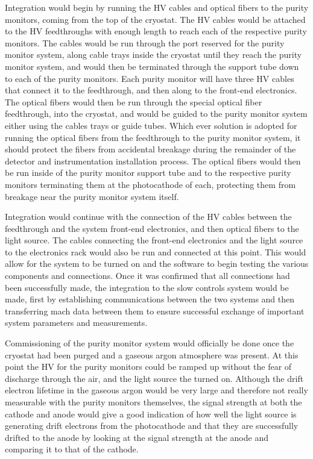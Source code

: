 Integration would begin by running the HV cables and optical fibers to the purity monitors, coming from the top of the cryostat.  The HV cables would be attached to the HV feedthroughs with enough length to reach each of the respective purity monitors.  The cables would be run through the port reserved for the purity monitor system, along cable trays inside the cryostat until they reach the purity monitor system, and would then be terminated through the support tube down to each of the purity monitors.  Each purity monitor will have three HV cables that connect it to the feedthrough, and then along to the front-end electronics.  The optical fibers would then be run through the special optical fiber feedthrough, into the cryostat, and would be guided to the purity monitor system either using the cables trays or guide tubes.  Which ever solution is adopted for running the optical fibers from the feedthrough to the purity monitor system, it should protect the fibers from accidental breakage during the remainder of the detector and instrumentation installation process.  The optical fibers would then be run inside of the purity monitor support tube and to the respective purity monitors terminating them at the photocathode of each, protecting them from breakage near the purity monitor system itself.

Integration would continue with the connection of the HV cables between the feedthrough and the system front-end electronics, and then optical fibers to the light source.  The cables connecting the front-end electronics and the light source to the electronics rack would also be run and connected at this point.  This would allow for the system to be turned on and the software to begin testing the various components and connections.  Once it was confirmed that all connections had been successfully made, the integration to the slow controls system would be made, first by establishing communications between the two systems and then transferring mach data between them to ensure successful exchange of important system parameters and measurements.  

Commissioning of the purity monitor system would officially be done once the cryostat had been purged and a gaseous argon atmosphere was present.  At this point the HV for the purity monitors could be ramped up without the fear of discharge through the air, and the light source the turned on.  Although the drift electron lifetime in the gaseous argon would be very large and therefore not really measurable with the purity monitors themselves, the signal strength at both the cathode and anode would give a good indication of how well the light source is generating drift electrons from the photocathode and that they are successfully drifted to the anode by looking at the signal strength at the anode and comparing it to that of the cathode.


